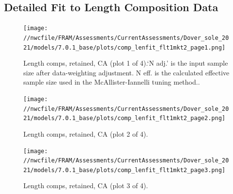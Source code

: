 \documentclass[11pt,
  english,
  a4paper,
]{article}
\begin{document}

\hypertarget{len-fit-data}{%
\subsection{Detailed Fit to Length Composition Data}\label{len-fit-data}}

\leavevmode\tagmcend\tagstructend


\begin{figure}
\centering
\texttt{[image: //nwcfile/FRAM/Assessments/CurrentAssessments/Dover\_sole\_2021/models/7.0.1\_base/plots/comp\_lenfit\_flt1mkt2\_page1.png]}
\caption{Length comps, retained, CA (plot 1 of 4).`N adj.' is the input sample size after data-weighting adjustment. N eff. is the calculated effective sample size used in the McAllister-Iannelli tuning method..\label{fig:comp_lenfit_flt1mkt2_page1}}
\end{figure}

\tagmcend\tagstructend


\begin{figure}
\centering
\texttt{[image: //nwcfile/FRAM/Assessments/CurrentAssessments/Dover\_sole\_2021/models/7.0.1\_base/plots/comp\_lenfit\_flt1mkt2\_page2.png]}
\caption{Length comps, retained, CA (plot 2 of 4).\label{fig:comp_lenfit_flt1mkt2_page2}}
\end{figure}

\tagmcend\tagstructend


\begin{figure}
\centering
\texttt{[image: //nwcfile/FRAM/Assessments/CurrentAssessments/Dover\_sole\_2021/models/7.0.1\_base/plots/comp\_lenfit\_flt1mkt2\_page3.png]}
\caption{Length comps, retained, CA (plot 3 of 4).\label{fig:comp_lenfit_flt1mkt2_page3}}
\end{figure}

\tagmcend\tagstructend

\end{document}

